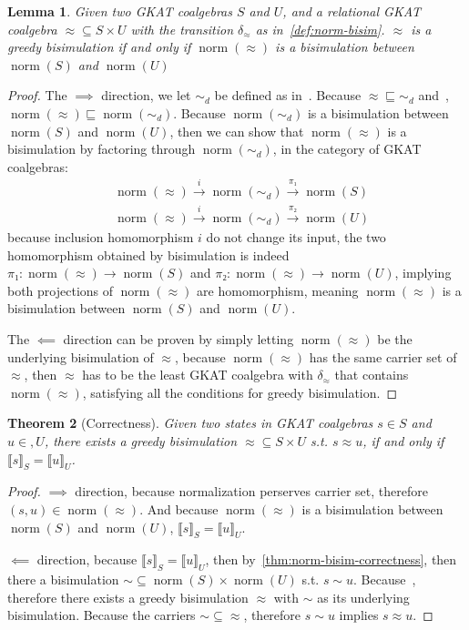 \documentclass[conference]{IEEEtran}
\newtheorem{theorem}{Theorem}
\newtheorem{lemma}[theorem]{Lemma}
\DeclareMathOperator{\norm}{\mathrm{norm}}
\begin{document}
\begin{lemma}\label{thm:greedy-bisim-iff-norm-bisim}
    Given two GKAT coalgebras \(S\) and \(U\), and a relational GKAT coalgebra \({≈} ⊆ S × U\) with the transition \(δ_≈\) as in~\cref{def:norm-bisim}.
    \(≈\) is a greedy bisimulation if and only if \(\norm(≈)\) is a bisimulation between \(\norm(S)\) and \(\norm(U)\)
\end{lemma}

\begin{proof}
    The \(⟹\) direction, we let \(∼_d\) be defined as in~.
    Because \({≈} ⊑ {∼_d}\) and~, \(\norm(≈) ⊑ \norm(∼_d)\). 
    Because \(\norm(∼_d)\) is a bisimulation between \(\norm(S)\) and \(\norm(U)\), then we can show that \(\norm(≈)\) is a bisimulation by factoring through \(\norm(∼_d)\), in the category of GKAT coalgebras:
    \begin{align*}
        & \norm(≈) 
        \xrightarrow{i} \norm(∼_d) 
        \xrightarrow{π₁} \norm(S) \\
        & \norm(≈) 
        \xrightarrow{i} \norm(∼_d) 
        \xrightarrow{π₂} \norm(U) 
    \end{align*}
    because inclusion homomorphism \(i\) do not change its input, the two homomorphism obtained by bisimulation is indeed \(π₁: \norm(≈) → \norm(S)\) and \(π₂: \norm(≈) → \norm(U)\), implying both projections of \(\norm(≈)\) are homomorphism, meaning \(\norm(≈)\) is a bisimulation between \(\norm(S)\) and \(\norm(U)\).

    The \(⟸\) direction can be proven by simply letting \(\norm(≈)\) be the underlying bisimulation of \(≈\), because \(\norm(≈)\) has the same carrier set of \(≈\), then \(≈\) has to be the least GKAT coalgebra with \(δ_≈\) that contains \(\norm(≈)\), satisfying all the conditions for greedy bisimulation.
\end{proof}

\begin{theorem}[Correctness]
    Given two states in GKAT coalgebras \(s ∈ S\) and \(u ∈ ,U\), there exists a greedy bisimulation \({≈} ⊆ S × U\) s.t. \(s ≈ u\), if and only if \(⟦s⟧_S = ⟦u⟧_U\).
\end{theorem}

\begin{proof}
    \(⟹\) direction, because normalization perserves carrier set, therefore \((s, u) ∈ \norm(≈)\).
    And because \(\norm(≈)\) is a bisimulation between \(\norm(S)\) and \(\norm(U)\), \(⟦s⟧_S = ⟦u⟧_U\).

    \(⟸\) direction, because \(⟦s⟧_S = ⟦u⟧_U\), then by~\cref{thm:norm-bisim-correctness}, then there a bisimulation \(∼ ⊆ \norm(S) × \norm(U)\) s.t. \(s ∼ u\). 
    Because~, therefore there exists a greedy bisimulation \(≈\) with \(∼\) as its underlying bisimulation. 
    Because the carriers \({∼} ⊆ {≈}\), therefore \(s ∼ u\) implies \(s ≈ u\).
\end{proof}
\end{document}
